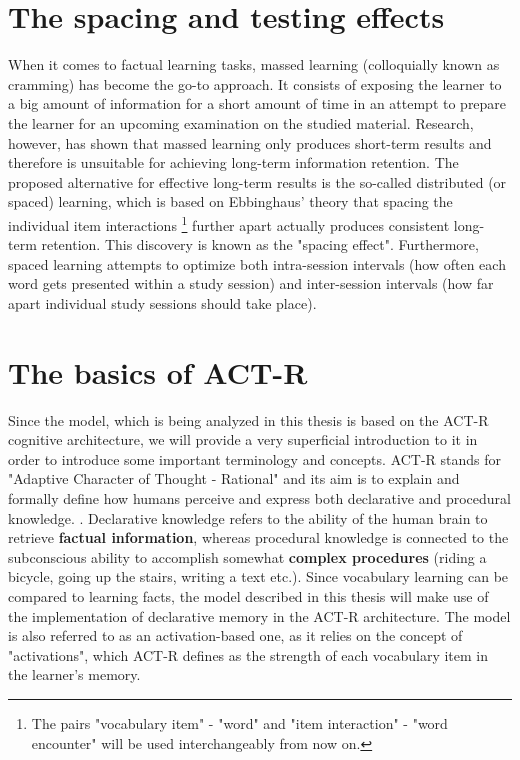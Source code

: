 \documentclass[a4paper]{report}
\begin{document}
\section{The spacing and testing effects}
When it comes to factual learning tasks, massed learning (colloquially known as cramming) has become the go-to approach. It consists of exposing the learner to a big amount of information for a short amount of time in an attempt to prepare the learner for an upcoming examination on the studied material. Research, however, has shown that massed learning only produces short-term results and therefore is unsuitable for achieving long-term information retention. The proposed alternative for effective long-term results is the so-called distributed (or spaced) learning, which is based on Ebbinghaus' theory that spacing the individual item interactions \footnote{The pairs "vocabulary item" - "word" and "item interaction" - "word encounter" will be used interchangeably from now on.} further apart actually produces consistent long-term retention. This discovery is known as the "spacing effect". Furthermore, spaced learning attempts to optimize both intra-session intervals (how often each word gets presented within a study session) and inter-session intervals (how far apart individual study sessions should take place). \citep{ebbinghaus85}

\section{The basics of ACT-R}
Since the model, which is being analyzed in this thesis is based on the ACT-R cognitive architecture, we will provide a very superficial introduction to it in order to introduce some important terminology and concepts. ACT-R stands for "Adaptive Character of Thought - Rational" and its aim is to explain and formally define how humans perceive and express both declarative and procedural knowledge. \citep{andbothell04}. Declarative knowledge refers to the ability of the human brain to retrieve \textbf{factual information}, whereas procedural knowledge is connected to the subconscious ability to accomplish somewhat \textbf{complex procedures} (riding a bicycle, going up the stairs, writing a text etc.). Since vocabulary learning can be compared to learning facts, the model described in this thesis will make use of the implementation of declarative memory in the ACT-R architecture. The model is also referred to as an activation-based one, as it relies on the concept of "activations", which ACT-R defines as the strength of each vocabulary item in the learner's memory. \citep{woudenberg08}
\end{document}
